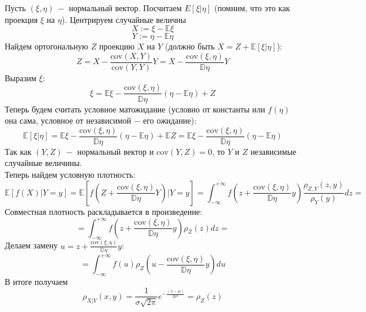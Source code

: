 \begin{example}
Пусть $\left(\xi, \eta\right) \ - $ нормальный вектор. Посчитаем $E\left[\xi | \eta\right]$ (помним, что это как проекция $\xi$ на $\eta$). Центрируем случайные величны
\[
    X := \xi - \mathbb{E} \xi
\]
\[
    Y := \eta - \mathbb{E} \eta
\]
Найдем ортогональную $Z$ проекцию $X$ на $Y$ (должно быть $X = Z + \mathbb{E}\left[\xi | \eta\right]$):
\[
    Z = X - \frac{\text{cov}\left(X, Y\right)}{\text{cov}\left(Y, Y\right)}Y = 
    X - \frac{\text{cov}\left(\xi, \eta\right)}{\mathbb{D}\eta}Y
\]
Выразим $\xi$:
\[
    \xi = \mathbb{E} \xi - \frac{\text{cov}\left(\xi, \eta\right)}{\mathbb{D}\eta}\left(\eta - \mathbb{E} \eta\right) + Z
\]
Теперь будем считать условное матожидание (условно от константы или $f\left(\eta\right)$ она сама, условное от независимой $-$ его ожидание):
\[
    \mathbb{E}\left[\xi | \eta\right] = \mathbb{E}\xi - \frac{\text{cov}\left(\xi, \eta\right)}{\mathbb{D}\eta}\left(\eta - \mathbb{E} \eta\right) + \mathbb{E} Z = \mathbb{E}\xi - \frac{\text{cov}\left(\xi, \eta\right)}{\mathbb{D}\eta}\left(\eta - \mathbb{E} \eta\right)
\]
Так как $\left(Y, Z\right) \ -$ нормальный вектор и $\text{cov}\left(Y, Z\right) = 0$, то $Y$ и $Z$ независимые случайные величины. \\
Теперь найдем условную плотность:
\[
    \mathbb{E}\left[f\left(X\right) | Y = y\right] = \mathbb{E} \left[f\left(Z + \frac{\text{cov}\left(\xi, \eta\right)}{\mathbb{D}\eta}Y\right) | Y = y\right] = \int_{-\infty}^{+\infty} f\left(z + \frac{\text{cov}\left(\xi, \eta\right)}{\mathbb{D}\eta}y\right) \frac{\rho_{Z, Y}\left(z, y\right)}{\rho_{Y}\left(y\right)} dz = 
\]
Совместная плотность раскладывается в произведение:
\[
    = \int_{-\infty}^{+\infty} f\left(z + \frac{\text{cov}\left(\xi, \eta\right)}{\mathbb{D}\eta}y\right) \rho_{Z}\left(z\right) dz = 
\]
Делаем замену $u = z + \frac{\text{cov}\left(\xi, \eta\right)}{\mathbb{D}\eta}y$:
\[
    = \int_{-\infty}^{+\infty} f\left(u\right) \rho_Z\left(u - \frac{\text{cov}\left(\xi, \eta\right)}{\mathbb{D}\eta} y\right) du
\]
В итоге получаем
\[
    \rho_{X|Y}\left(x, y\right) = \frac{1}{\sigma \sqrt{2\pi}} e ^ {-\frac{\left(x - \mu\right)}{2 \sigma ^ 2}} = \rho_{Z}\left(z \right)
\]
\end{example}

